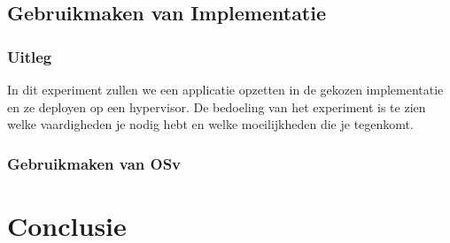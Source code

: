 \documentclass[pdftex,a4paper,12pt,twoside]{report}
\begin{document}
\section{Gebruikmaken van Implementatie}

\subsection{Uitleg}

In dit experiment zullen we een applicatie opzetten in de gekozen implementatie en ze deployen op een hypervisor.
De bedoeling van het experiment is te zien welke vaardigheden je nodig hebt en welke moeilijkheden die je tegenkomt.

\subsection{Gebruikmaken van OSv}



\chapter{Conclusie}
\label{ch:conclusie}







\listoffigures
\listoftables
\end{document}
